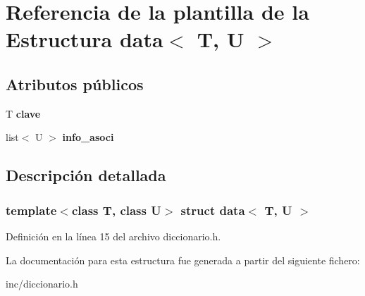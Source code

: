 \hypertarget{structdata}{}\section{Referencia de la plantilla de la Estructura data$<$ T, U $>$}
\label{structdata}
\subsection*{Atributos públicos}
\begin{DoxyCompactItemize}
\item 
\mbox{\label{structdata_aa3298b9b021e026f8663005d2fc19e1a}} 
T {\bfseries clave}
\item 
\mbox{\label{structdata_a8299bf6975cfaffbb2354a65881e16a2}} 
list$<$ U $>$ {\bfseries info\+\_\+asoci}
\end{DoxyCompactItemize}


\subsection{Descripción detallada}
\subsubsection*{template$<$class T, class U$>$\newline
struct data$<$ T, U $>$}



Definición en la línea 15 del archivo diccionario.\+h.



La documentación para esta estructura fue generada a partir del siguiente fichero\+:\begin{DoxyCompactItemize}
\item 
inc/diccionario.\+h\end{DoxyCompactItemize}
